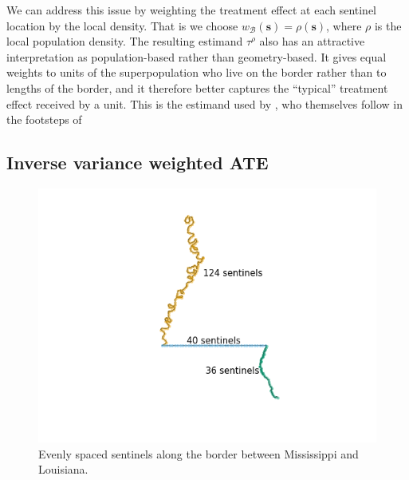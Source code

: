 \documentclass[letter]{article}
\makeatletter
\def\maxwidth{\ifdim\Gin@nat@width>\linewidth\linewidth
\else\Gin@nat@width\fi}
\let\Oldincludegraphics\includegraphics
\renewcommand{\includegraphics}[1]{\Oldincludegraphics[width=1.0\maxwidth]{#1}}
\newcommand{\svec}{\mathbold{s}}
\newcommand{\boundary}{\mathcal{B}}
\newcommand{\taurho}{\tau^{\rho}}
\newcommand{\weightb}{w_{\boundary}}
\renewcommand{\cite}[1]{\citep{#1}}
\makeatother
\begin{document}
We can address this issue by weighting the treatment effect at each sentinel location by the local density.
That is we choose \(\weightb(\svec) = \rho(\svec)\), where \(\rho\) is the local population density.
The resulting estimand \(\taurho\) also has an attractive interpretation as population-based rather than geometry-based.
It gives equal weights to units of the superpopulation who live on the border rather than to lengths of the border,
and it therefore better captures the ``typical'' treatment effect received by a unit.
This is the estimand used by \cite{keele_titiunik_2015}, who themselves follow in the footsteps of \cite{imbens2011regression}
    


    	\subsection{Inverse variance weighted ATE}\label{inverse-variance-weighted-ate}

\begin{figure}
\centering
\includegraphics{../figures/mississippi_counts.png}
\caption{\label{fig:mississippi_counts} Evenly spaced sentinels along the border between Mississippi and Louisiana.}
\end{figure}
\end{document}
